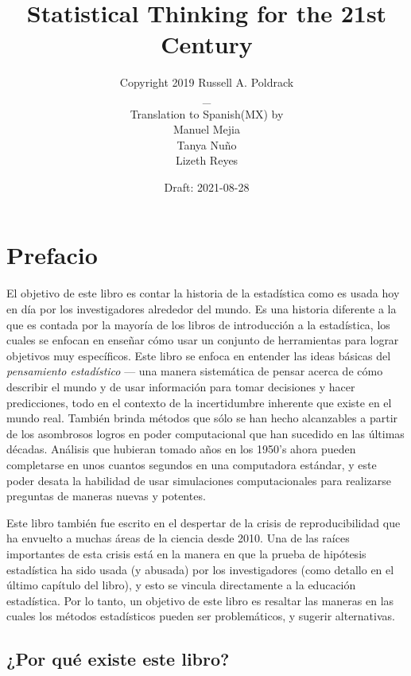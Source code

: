 \documentclass[
  12pt,
]{book}
\title{Statistical Thinking for the 21st Century}
\author{Copyright 2019 Russell A. Poldrack\\
\_\\
Translation to Spanish(MX) by\\
Manuel Mejia\\
Tanya Nuño\\
Lizeth Reyes}
\date{Draft: 2021-08-28}
\begin{document}
\maketitle

{
\hypersetup{linkcolor=}
\setcounter{tocdepth}{1}
\tableofcontents
}
\hypertarget{prefacio}{%
\chapter*{Prefacio}\label{prefacio}}

El objetivo de este libro es contar la historia de la estadística como es usada hoy en día por los investigadores alrededor del mundo. Es una historia diferente a la que es contada por la mayoría de los libros de introducción a la estadística, los cuales se enfocan en enseñar cómo usar un conjunto de herramientas para lograr objetivos muy específicos. Este libro se enfoca en entender las ideas básicas del \emph{pensamiento estadístico} --- una manera sistemática de pensar acerca de cómo describir el mundo y de usar información para tomar decisiones y hacer predicciones, todo en el contexto de la incertidumbre inherente que existe en el mundo real. También brinda métodos que sólo se han hecho alcanzables a partir de los asombrosos logros en poder computacional que han sucedido en las últimas décadas. Análisis que hubieran tomado años en los 1950's ahora pueden completarse en unos cuantos segundos en una computadora estándar, y este poder desata la habilidad de usar simulaciones computacionales para realizarse preguntas de maneras nuevas y potentes.

Este libro también fue escrito en el despertar de la crisis de reproducibilidad que ha envuelto a muchas áreas de la ciencia desde 2010. Una de las raíces importantes de esta crisis está en la manera en que la prueba de hipótesis estadística ha sido usada (y abusada) por los investigadores (como detallo en el último capítulo del libro), y esto se vincula directamente a la educación estadística. Por lo tanto, un objetivo de este libro es resaltar las maneras en las cuales los métodos estadísticos pueden ser problemáticos, y sugerir alternativas.

\hypertarget{por-quuxe9-existe-este-libro}{%
\section{¿Por qué existe este libro?}\label{por-quuxe9-existe-este-libro}}
\end{document}

